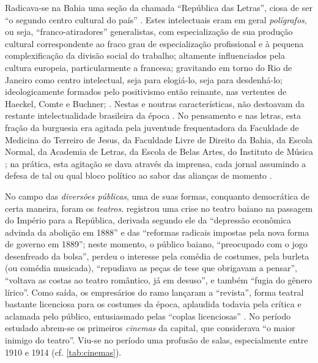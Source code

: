 Radicava-se na Bahia uma seção da chamada ``República das Letras'', ciosa de ser ``o segundo centro cultural do país'' \cite[p.~263]{machadoneto_bahiaint_1972}. Estes intelectuais eram em geral \textit{polígrafos}, ou seja, ``franco-atiradores'' generalistas, com especialização de sua produção cultural correspondente ao fraco grau de especialização profissional e à pequena complexificação da divisão social do trabalho; altamente influenciados pela cultura europeia, particularmente a francesa; gravitando em torno do Rio de Janeiro como centro intelectual, seja para elogiá-lo, seja para desdenhá-lo; ideologicamente formados pelo positivismo então reinante, nas vertentes de Haeckel, Comte e Buchner;  \cite{MachadoNeto1966,machadoneto_bahiaint_1972}.  Nestas e noutras características, não destoavam da restante intelectualidade brasileira da época \cite{martins_intelv5_1977,martins_intelv6_1978}. No pensamento e nas letras, esta fração da burguesia era agitada pela juventude frequentadora da Faculdade de Medicina do Terreiro de Jesus, da Faculdade Livre de Direito da Bahia, da Escola Normal, da Academia de Letras, da Escola de Belas Artes, do Instituto de Música \cite[p.~272]{machadoneto_bahiaint_1972}; na prática, esta agitação se dava através da imprensa, cada jornal assumindo a defesa de tal ou qual bloco político ao sabor das alianças de momento \cite{souza_imprensa_1972,machadoneto_bahiaint_1972}.

No campo das \textit{diversões públicas}, uma de suas formas, conquanto democrática de certa maneira, foram os \textit{teatros}.  registrou uma crise no teatro baiano na passagem do Império para a República, derivada segundo ele da ``depressão econômica advinda da abolição em 1888'' e das ``reformas radicais impostas pela nova forma de governo em 1889''; neste momento, o público baiano, ``preocupado com o jogo desenfreado da bolsa'', perdeu o interesse pela comédia de costumes, pela burleta (ou comédia musicada), ``repudiava as peças de tese que obrigavam a pensar'', ``voltava as costas ao teatro romântico, já em desuso'', e também ``fugia do gênero lírico''. Como saída, os empresários do ramo lançaram a ``revista'', forma teatral bastante licenciosa para os costumes da época, aplaudida todavia pela crítica e aclamada pelo público, entusiasmado pelas ``coplas licenciosas'' \cite[p.~48-49]{ruy_teatro_1959}. No período estudado abrem-se os primeiros \textit{cinemas} da capital, que  considerava ``o maior inimigo do teatro''. Viu-se no período uma profusão de salas, especialmente entre 1910 e 1914 (cf. \autoref{tab:cinemas}).

